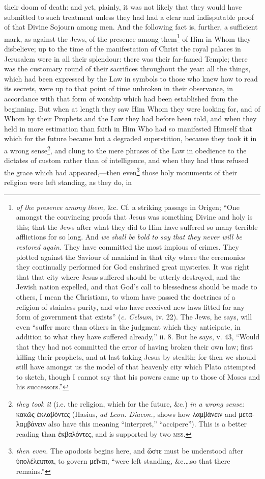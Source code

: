 their doom of death: and yet, plainly, it was not likely that they would have submitted to such treatment unless they had had a clear and indisputable proof of that Divine Sojourn among men. And the following fact is, further, a sufficient mark, as against the Jews, of the presence among them\footnote{\emph{of the presence among them,} \&c. Cf. a striking passage in Origen; “One amongst the convincing proofs that Jesus was something Divine and holy is this; that the Jews after what they did to Him have suffered so many terrible afflictions for so long. And \emph{we shall be bold to say that they never will be restored again.} They have committed the most impious of crimes. They plotted against the Saviour of mankind in that city where the ceremonies they continually performed for God enshrined great mysteries. It was right that that city where Jesus suffered should be utterly destroyed, and the Jewish nation expelled, and that God’s call to blessedness should be made to others, I mean the Christians, to whom have passed the doctrines of a religion of stainless purity, and who have received new laws fitted for any form of government that exists” (\emph{c. Celsum,} iv. 22). The Jews, he says, will even “suffer more than others in the judgment which they anticipate, in addition to what they have suffered already,” ii. 8. But he says, v. 43, “Would that they had not committed the error of having broken their own law; first killing their prophets, and at last taking Jesus by stealth; for then we should still have amongst us the model of that heavenly city which Plato attempted to sketch, though I cannot say that his powers came up to those of Moses and his successors.”} of Him in Whom they disbelieve; up to the time of the manifestation of Christ the royal palaces in Jerusalem were in all their splendour: there was their far-famed Temple; there was the customary round of their sacrifices throughout the year: all the things, which had been expressed by the Law in symbols to those who knew how to read its secrets, were up to that point of time unbroken in their observance, in accordance with that form of worship which had been established from the beginning. But when at length they saw Him Whom they were looking for, and of Whom by their Prophets and the Law they had before been told, and when they held in more estimation than faith in Him Who had so manifested Himself that which for the future became but a degraded superstition, because they took it in a wrong sense\footnote{\emph{they took it} (i.e. the religion, which for the future, \&c.) \emph{in a wrong sense:} \textgreek{κακῶς ἐκλαβόντες} (Hasius, \emph{ad Leon. Diacon.,} shows how \textgreek{λαμβάνειν} and \textgreek{μεταλαμβάνειν} also have this meaning “interpret,” “accipere”). This is a better reading than \textgreek{ἐκβαλόντες}, and is supported by two \textsc{mss.}}, and clung to the mere phrases of the Law in obedience to the dictates of custom rather than of intelligence, and when they had thus refused the grace which had appeared,—then even\footnote{\emph{then even.} The apodosis begins here, and \textgreek{ὥστε} must be understood after \textgreek{ὑπολέλειπται}, to govern \textgreek{μεῖναι}, “were left standing, \&c.…so that there remains.”} those holy monuments of their religion were left standing, as they do, in 